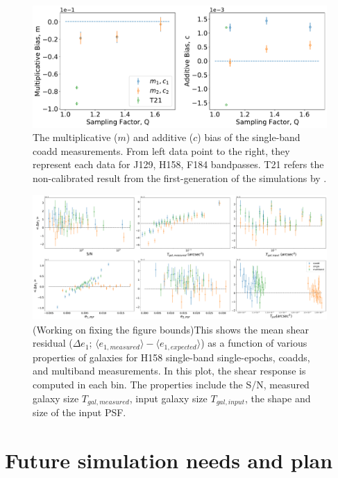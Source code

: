 \documentclass[fleqn,usenatbib]{mnras}
\begin{document}
\begin{figure}
	\includegraphics[width=\textwidth]{final_result_v2.pdf}
    \caption{The multiplicative ($m$) and additive ($c$) bias of the single-band coadd measurements. From left data point to the right, they represent each data for J129, H158, F184 bandpasses. T21 refers the non-calibrated result from the first-generation of the simulations by \cite{2021MNRAS.501.2044T}. }
    \label{fig:final_result}
\end{figure}

\begin{figure}
    \centering
	\includegraphics[width=\textwidth]{H158_meanshear_measured_properties_perbin_e1_v2.pdf}
    \caption{(Working on fixing the figure bounds)This shows the mean shear residual ($\Delta e_{1}$; $\langle e_{1,measured} \rangle - \langle e_{1,expected} \rangle$) as a function of various properties of galaxies for H158 single-band single-epochs, coadds, and multiband measurements. In this plot, the shear response is computed in each bin. The properties include the S/N, measured galaxy size $T_{gal,measured}$, input galaxy size $T_{gal,input}$, the shape and size of the input PSF.}
    \label{fig:meanshear}
\end{figure}


\section{Future simulation needs and plan}
\label{sec:discussion}
\end{document}
